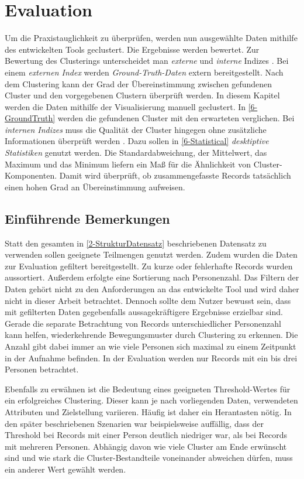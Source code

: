 \chapter{Evaluation}
\label{chapter6}
Um die Praxistauglichkeit zu überprüfen, werden nun ausgewählte Daten
mithilfe des entwickelten Tools geclustert.
Die Ergebnisse werden bewertet.
Zur Bewertung des Clusterings unterscheidet man \emph{externe}
und \emph{interne} Indizes \citep{aghabozorgi_time-series_2015, warren_liao_clustering_2005}.
Bei einem \emph{externen Index} werden \emph{Ground-Truth-Daten} extern bereitgestellt.
Nach dem Clustering kann der Grad der Übereinstimmung zwischen gefundenen Cluster
und den vorgegebenen Clustern überprüft werden.
In diesem Kapitel werden die Daten mithilfe der Visualisierung manuell geclustert.
In \autoref{6-GroundTruth} werden die gefundenen Cluster mit den erwarteten verglichen.
Bei \emph{internen Indizes} muss die Qualität der Cluster hingegen
ohne zusätzliche Informationen überprüft werden \citep{aghabozorgi_time-series_2015, warren_liao_clustering_2005}.
Dazu sollen in \autoref{6-Statistical} \emph{desktiptive Statistiken} genutzt werden.
Die Standardabweichung, der Mittelwert, das Maximum und das Minimum liefern
ein Maß für die Ähnlichkeit von Cluster-Komponenten.
Damit wird überprüft,
ob zusammengefasste Records tatsächlich einen hohen Grad an Übereinstimmung aufweisen.

\section{Einführende Bemerkungen}
\label{6-Bemerkungen}
Statt den gesamten in \autoref{2-StrukturDatensatz} beschriebenen Datensatz zu verwenden
sollen geeignete Teilmengen genutzt werden.
Zudem wurden die Daten zur Evaluation gefiltert bereitgestellt.
Zu kurze oder fehlerhafte Records wurden aussortiert.
Außerdem erfolgte eine Sortierung nach Personenzahl.
Das Filtern der Daten gehört nicht zu den Anforderungen an das entwickelte Tool
und wird daher nicht in dieser Arbeit betrachtet.
Dennoch sollte dem Nutzer bewusst sein,
dass mit gefilterten Daten gegebenfalls aussagekräftigere Ergebnisse erzielbar sind.
Gerade die separate Betrachtung von Records unterschiedlicher Personenzahl kann helfen,
wiederkehrende Bewegungsmuster durch Clustering zu erkennen.
Die Anzahl gibt dabei immer an wie viele Personen sich maximal
zu einem Zeitpunkt in der Aufnahme befinden.
In der Evaluation werden nur Records mit ein bis drei Personen betrachtet.

Ebenfalls zu erwähnen ist die Bedeutung eines geeigneten Threshold-Wertes für ein erfolgreiches Clustering.
Dieser kann je nach vorliegenden Daten, verwendeten Attributen und Zielstellung variieren.
Häufig ist daher ein {\glqq Herantasten\grqq} nötig.
In den später beschriebenen Szenarien war beispielsweise auffällig,
dass der Threshold bei Records mit einer Person deutlich niedriger war,
als bei Records mit mehreren Personen.
Abhängig davon wie viele Cluster am Ende erwünscht sind
und wie stark die Cluster-Bestandteile voneinander abweichen dürfen,
muss ein anderer Wert gewählt werden.

